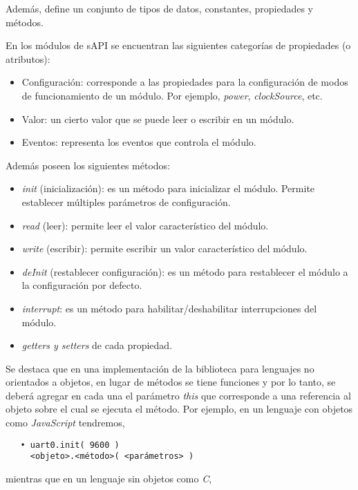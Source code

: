 Además, define un conjunto de tipos de datos, constantes, propiedades y métodos.

En los módulos de sAPI se encuentran las siguientes categorías de propiedades (o atributos):

\begin{itemize}
\item
Configuración: corresponde a las propiedades para la configuración de modos de funcionamiento de un módulo. Por ejemplo, \emph{power}, \emph{clockSource}, etc.
\item
Valor: un cierto valor que se puede leer o escribir en un módulo.
\item
Eventos: representa los eventos que controla el módulo.
\end{itemize}

Además poseen los siguientes métodos:

\begin{itemize}
\item
\emph{init} (inicialización): es un método para inicializar el módulo. Permite establecer múltiples parámetros de configuración.
\item
\emph{read} (leer): permite leer el valor característico del módulo.
\item
\emph{write} (escribir): permite escribir un valor característico del módulo.
\item
\emph{deInit} (restablecer configuración): es un método para restablecer el módulo a la configuración por defecto.
\item
\emph{interrupt}: es un método para habilitar/deshabilitar interrupciones del módulo.
\item
\emph{getters y setters} de cada propiedad.
\end{itemize}

Se destaca que en una implementación de la biblioteca para lenguajes no orientados a objetos, en lugar de métodos se tiene funciones y por lo tanto, se deberá agregar en cada una el parámetro \emph{this} que corresponde a una referencia al objeto sobre el cual se ejecuta el método. Por ejemplo, en un lenguaje con objetos como \emph{JavaScript} tendremos,

\begin{verbatim}
   • uart0.init( 9600 )
     <objeto>.<método>( <parámetros> )
\end{verbatim}  

mientras que en un lenguaje sin objetos como \emph{C},

